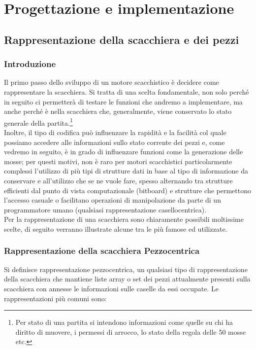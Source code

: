 \chapter{Progettazione e implementazione}
%

\section{Rappresentazione della scacchiera e dei pezzi}

\subsection{Introduzione} %

Il primo passo dello sviluppo di un motore scacchistico è decidere come rappresentare la scacchiera. Si tratta di una scelta fondamentale, non solo perché in seguito ci permetterà
di testare le funzioni che andremo a implementare, ma anche perché è nella scacchiera che, generalmente,
viene conservato lo stato generale della partita.\footnote{Per stato di una partita si intendono informazioni come
quelle su chi ha diritto di muovere, i permessi di arrocco, lo stato della regola delle 50 mosse etc.}
\\Inoltre, il tipo di codifica può influenzare la rapidità
e la facilità col quale possiamo accedere alle informazioni sullo stato corrente dei pezzi
e, come vedremo in seguito, è in grado di influenzare funzioni come la generazione delle mosse; per questi motivi,
non è raro per motori scacchistici particolarmente complessi l'utilizzo di più tipi di strutture dati in base
al tipo di informazione da conservare e all'utilizzo che se ne vuole fare, spesso alternando tra strutture efficienti dal punto di vista computazionale (bitboard) e strutture che permettono l'accesso casuale o facilitano 
operazioni di manipolazione da parte di un programmatore umano (qualsiasi rappresentazione casellocentrica).
\\Per la rappresentazione di una scacchiera sono chiaramente possibili moltissime scelte, di seguito
verranno illustrate alcune tra le più famose ed utilizzate.

\subsection{Rappresentazione della scacchiera Pezzocentrica}
Si definisce rappresentazione pezzocentrica, un qualsiasi tipo di rappresentazione della scacchiera che mantiene liste
array o set dei pezzi attualmente presenti sulla scacchiera con annesse le informazioni sulle caselle da essi occupate.
Le rappresentazioni più comuni sono:
